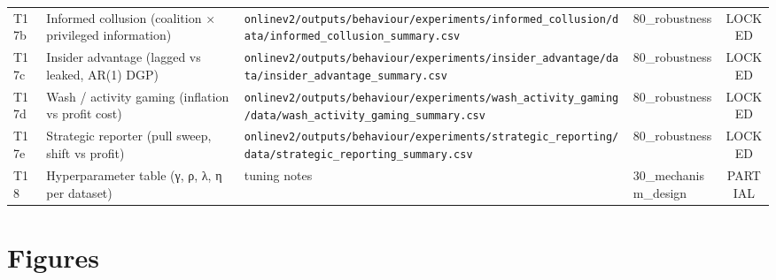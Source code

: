 \documentclass[11pt,a4paper,openany]{report}
\begin{document}
\begin{center}
\begin{tabular}{llllc}
T17b & Informed collusion (coalition × privileged information) & \texttt{onlinev2/outputs/behaviour/experiments/informed\_collusion/data/informed\_collusion\_summary.csv} & 80\_robustness & LOCKED \\
T17c & Insider advantage (lagged vs leaked, AR(1) DGP) & \texttt{onlinev2/outputs/behaviour/experiments/insider\_advantage/data/insider\_advantage\_summary.csv} & 80\_robustness & LOCKED \\
T17d & Wash / activity gaming (inflation vs profit cost) & \texttt{onlinev2/outputs/behaviour/experiments/wash\_activity\_gaming/data/wash\_activity\_gaming\_summary.csv} & 80\_robustness & LOCKED \\
T17e & Strategic reporter (pull sweep, shift vs profit) & \texttt{onlinev2/outputs/behaviour/experiments/strategic\_reporting/data/strategic\_reporting\_summary.csv} & 80\_robustness & LOCKED \\
T18 & Hyperparameter table (γ, ρ, λ, η per dataset) & tuning notes & 30\_mechanism\_design & PARTIAL \\
\bottomrule
\end{tabular}
\end{center}

\section{Figures}
\end{document}

